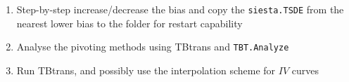 \begin{frame}
\begin{enumerate}
    \item Step-by-step increase/decrease the bias and copy the \texttt{siesta.TSDE} from
    the nearest lower bias to the folder for restart capability

    \item Analyse the pivoting methods using TBtrans and \texttt{TBT.Analyze}
    
    \item Run TBtrans, and possibly use the interpolation scheme for $IV$ curves
    
  \end{enumerate}

\end{frame}

